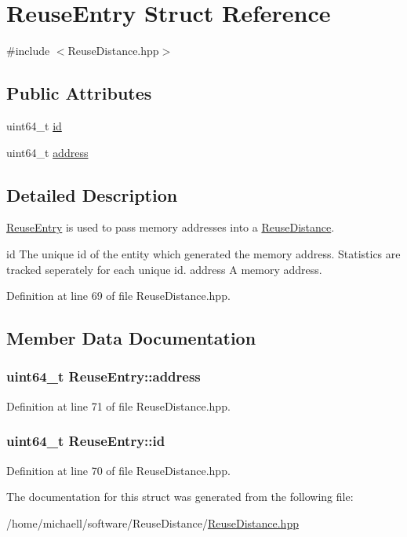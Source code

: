 \hypertarget{struct_reuse_entry}{
\section{ReuseEntry Struct Reference}
\label{struct_reuse_entry}
}


{\ttfamily \#include $<$ReuseDistance.hpp$>$}

\subsection*{Public Attributes}
\begin{DoxyCompactItemize}
\item 
uint64\_\-t \hyperlink{struct_reuse_entry_ab30e9a6fae29a6453f5fa2245e441f3a}{id}
\item 
uint64\_\-t \hyperlink{struct_reuse_entry_a40bd37796c5f75438f28f5b6d090a432}{address}
\end{DoxyCompactItemize}


\subsection{Detailed Description}
\hyperlink{struct_reuse_entry}{ReuseEntry} is used to pass memory addresses into a \hyperlink{class_reuse_distance}{ReuseDistance}.

id The unique id of the entity which generated the memory address. Statistics are tracked seperately for each unique id.  address A memory address. 

Definition at line 69 of file ReuseDistance.hpp.



\subsection{Member Data Documentation}
\hypertarget{struct_reuse_entry_a40bd37796c5f75438f28f5b6d090a432}{
\subsubsection[{address}]{\setlength{\rightskip}{0pt plus 5cm}uint64\_\-t {\bf ReuseEntry::address}}}
\label{struct_reuse_entry_a40bd37796c5f75438f28f5b6d090a432}


Definition at line 71 of file ReuseDistance.hpp.

\hypertarget{struct_reuse_entry_ab30e9a6fae29a6453f5fa2245e441f3a}{
\subsubsection[{id}]{\setlength{\rightskip}{0pt plus 5cm}uint64\_\-t {\bf ReuseEntry::id}}}
\label{struct_reuse_entry_ab30e9a6fae29a6453f5fa2245e441f3a}


Definition at line 70 of file ReuseDistance.hpp.



The documentation for this struct was generated from the following file:\begin{DoxyCompactItemize}
\item 
/home/michaell/software/ReuseDistance/\hyperlink{_reuse_distance_8hpp}{ReuseDistance.hpp}\end{DoxyCompactItemize}
